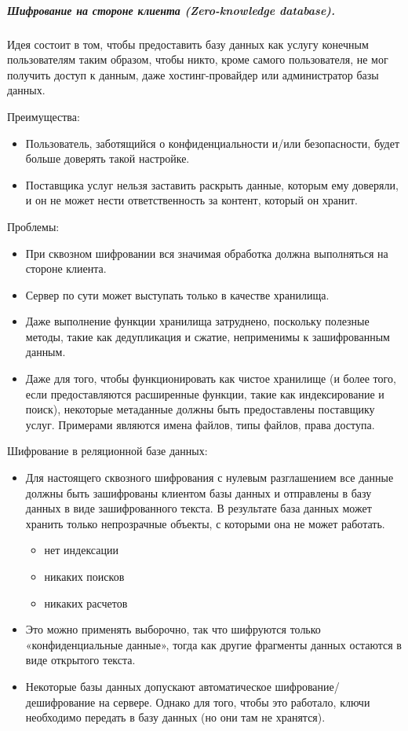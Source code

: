 \subparagraph{Шифрование на стороне клиента (Zero-knowledge database).}

Идея состоит в том, чтобы предоставить базу данных как услугу конечным пользователям таким образом,
чтобы никто, кроме самого пользователя, не мог получить доступ к данным, даже хостинг-провайдер
или администратор базы данных.

Преимущества:
\begin{itemize}
    \item Пользователь, заботящийся о конфиденциальности и/или безопасности, будет больше доверять
        такой настройке.
    \item Поставщика услуг нельзя заставить раскрыть данные, которым ему доверяли, и он не может
        нести ответственность за контент, который он хранит.
\end{itemize}

Проблемы:
\begin{itemize}
    \item При сквозном шифровании вся значимая обработка должна выполняться на стороне клиента.
    \item Сервер по сути может выступать только в качестве хранилища.
    \item Даже выполнение функции хранилища затруднено, поскольку полезные методы, такие как
        дедупликация и сжатие, неприменимы к зашифрованным данным.
    \item Даже для того, чтобы функционировать как чистое хранилище (и более того, если
        предоставляются расширенные функции, такие как индексирование и поиск), некоторые
        метаданные должны быть предоставлены поставщику услуг. Примерами являются имена файлов,
        типы файлов, права доступа.
\end{itemize}

Шифрование в реляционной базе данных:
\begin{itemize}
    \item Для настоящего сквозного шифрования с нулевым разглашением все данные должны быть зашифрованы
        клиентом базы данных и отправлены в базу данных в виде зашифрованного текста. В результате база
        данных может хранить только непрозрачные объекты, с которыми она не может работать.
    \begin{itemize}
        \item нет индексации
        \item никаких поисков
        \item никаких расчетов
    \end{itemize}
    \item Это можно применять выборочно, так что шифруются только «конфиденциальные данные», тогда
        как другие фрагменты данных остаются в виде открытого текста.
    \item Некоторые базы данных допускают автоматическое шифрование/дешифрование на сервере. Однако
        для того, чтобы это работало, ключи необходимо передать в базу данных (но они там не
        хранятся).
\end{itemize}

